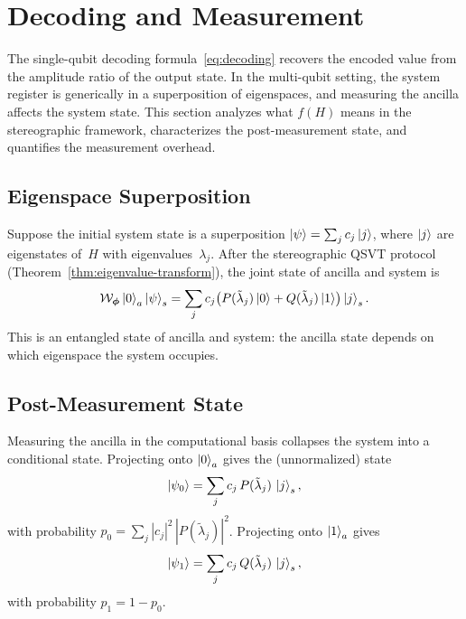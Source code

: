 \section{Decoding and Measurement}
\label{sec:decoding}

The single-qubit decoding formula~\eqref{eq:decoding} recovers
the encoded value from the amplitude ratio of the output state.
In the multi-qubit setting, the system register is generically in
a superposition of eigenspaces, and measuring the ancilla affects
the system state.  This section analyzes what $f(H)$ means in the
stereographic framework, characterizes the post-measurement state,
and quantifies the measurement overhead.

\subsection{Eigenspace Superposition}
\label{subsec:superposition}

Suppose the initial system state is a superposition
$\ket{\psi} = \sum_j c_j \ket{j}$, where $\ket{j}$ are
eigenstates of~$H$ with eigenvalues~$\lambda_j$.  After the
stereographic QSVT protocol
(Theorem~\ref{thm:eigenvalue-transform}), the joint state of
ancilla and system is
\begin{equation}
	\mathcal{W}_{\bm{\phi}}\ket{0}_a\ket{\psi}_s
	= \sum_j c_j
	\bigl(P(\tilde{\lambda}_j)\ket{0}
	+ Q(\tilde{\lambda}_j)\ket{1}\bigr)\ket{j}_s.
	\label{eq:superposition-state}
\end{equation}
This is an entangled state of ancilla and system: the ancilla
state depends on which eigenspace the system occupies.

\subsection{Post-Measurement State}
\label{subsec:post-measurement}

Measuring the ancilla in the computational basis collapses the
system into a conditional state.  Projecting onto
$\ket{0}_a$ gives the (unnormalized) state
\begin{equation}
	\ket{\psi_0} = \sum_j c_j\, P(\tilde{\lambda}_j)\,\ket{j}_s,
	\label{eq:post-measurement-0}
\end{equation}
with probability
$p_0 = \sum_j |c_j|^2\,|P(\tilde{\lambda}_j)|^2$.
Projecting onto $\ket{1}_a$ gives
\begin{equation}
	\ket{\psi_1} = \sum_j c_j\, Q(\tilde{\lambda}_j)\,\ket{j}_s,
	\label{eq:post-measurement-1}
\end{equation}
with probability $p_1 = 1 - p_0$.


